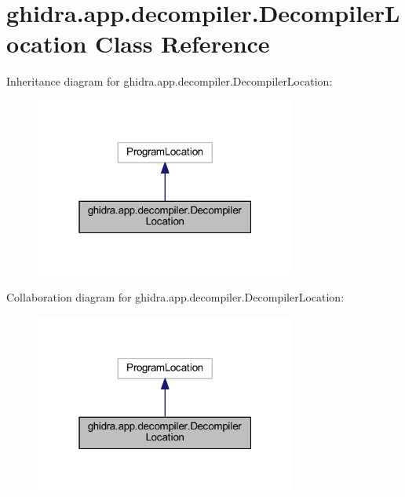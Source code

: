 \hypertarget{classghidra_1_1app_1_1decompiler_1_1_decompiler_location}{}\section{ghidra.\+app.\+decompiler.\+Decompiler\+Location Class Reference}
\label{classghidra_1_1app_1_1decompiler_1_1_decompiler_location}


Inheritance diagram for ghidra.\+app.\+decompiler.\+Decompiler\+Location\+:
\nopagebreak
\begin{figure}[H]
\begin{center}
\leavevmode
\includegraphics[width=244pt]{classghidra_1_1app_1_1decompiler_1_1_decompiler_location__inherit__graph}
\end{center}
\end{figure}


Collaboration diagram for ghidra.\+app.\+decompiler.\+Decompiler\+Location\+:
\nopagebreak
\begin{figure}[H]
\begin{center}
\leavevmode
\includegraphics[width=244pt]{classghidra_1_1app_1_1decompiler_1_1_decompiler_location__coll__graph}
\end{center}
\end{figure}
